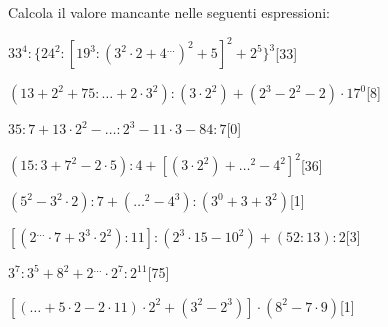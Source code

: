 Calcola il valore mancante nelle seguenti espressioni:

\begin{esercizio} \label{ese:1.17}
$33^4:\{24^2:[19^3:(3^2\cdot2+4^{\dots})^2+5]^2+2^{5}\}^3$\hfill[33]
\end{esercizio}
\begin{esercizio} \label{ese:1.17}
$(13+2^2+75:{\dots}+2\cdot3^2):(3\cdot2^2)+(2^3-2^2-2)\cdot17^0$\hfill[8]
\end{esercizio}
\begin{esercizio} \label{ese:1.17}
$35:7+13\cdot2^2-{\dots}:2^3-11\cdot3-84:7$\hfill[0]
\end{esercizio}
\begin{esercizio} \label{ese:1.17}
$(15:3+7^2-2\cdot5):4+[(3\cdot2^2)+{\dots}^2-4^2]^2$\hfill[36]
\end{esercizio}
\begin{esercizio} \label{ese:1.17}
$(5^2-3^2\cdot2):7+({\dots}^2-4^3):(3^0+3+3^2)$\hfill[1]
\end{esercizio}
\begin{esercizio} \label{ese:1.17}
$[(2^{\dots}\cdot7+3^3\cdot2^2):11]:(2^3\cdot15-10^2)+(52:13):2$\hfill[3]
\end{esercizio}
\begin{esercizio} \label{ese:1.17}
$3^7:3^5+8^2+2^{\dots}\cdot2^7:2^{11}$\hfill[75]
\end{esercizio}
\begin{esercizio} \label{ese:1.17}
$[({\dots}+5\cdot2-2\cdot11)\cdot2^2+(3^2-2^3)]\cdot(8^2-7\cdot9)$\hfill[1]
\end{esercizio}

